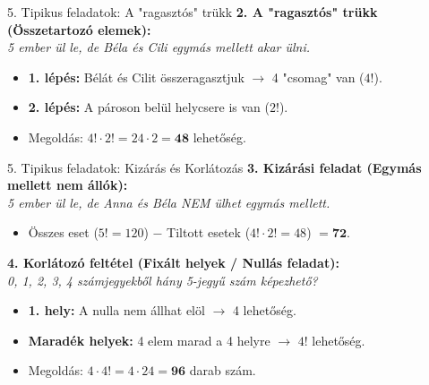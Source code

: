 \documentclass{beamer}
\begin{document}
\begin{frame}{5. Tipikus feladatok: A "ragasztós" trükk}
    \small
    \textbf{2. A "ragasztós" trükk (Összetartozó elemek):} \\
    \emph{5 ember ül le, de Béla és Cili egymás mellett akar ülni.}
    \begin{itemize}
        \item \textbf{1. lépés:} Bélát és Cilit összeragasztjuk $\rightarrow$ 4 "csomag" van ($4!$).
        \item \textbf{2. lépés:} A pároson belül helycsere is van ($2!$).
        \item Megoldás: $4! \cdot 2! = 24 \cdot 2 = \mathbf{48}$ lehetőség.
    \end{itemize}
\end{frame}

\begin{frame}{5. Tipikus feladatok: Kizárás és Korlátozás}
    \small
    \textbf{3. Kizárási feladat (Egymás mellett nem állók):} \\
    \emph{5 ember ül le, de Anna és Béla NEM ülhet egymás mellett.}
    \begin{itemize}
        \item Összes eset ($5! = 120$) $-$ Tiltott esetek ($4! \cdot 2! = 48$) $= \mathbf{72}$.
    \end{itemize}

    \vspace{0.3cm}
    \textbf{4. Korlátozó feltétel (Fixált helyek / Nullás feladat):} \\
    \emph{0, 1, 2, 3, 4 számjegyekből hány 5-jegyű szám képezhető?}
    \begin{itemize}
        \item \textbf{1. hely:} A nulla nem állhat elöl $\rightarrow$ 4 lehetőség.
        \item \textbf{Maradék helyek:} 4 elem marad a 4 helyre $\rightarrow$ $4!$ lehetőség.
        \item Megoldás: $4 \cdot 4! = 4 \cdot 24 = \mathbf{96}$ darab szám.
    \end{itemize}
\end{frame}
\end{document}
